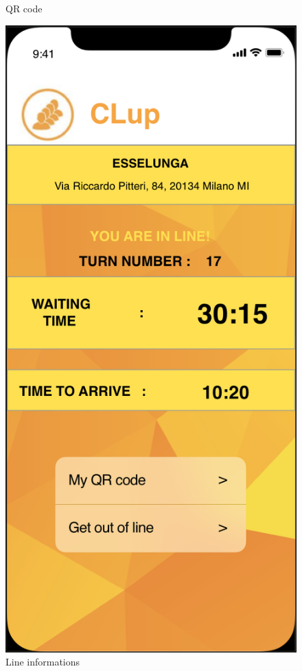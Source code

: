 \documentclass{article}
\begin{document}
\begin{figure}[H]
\begin{minipage}[b]{0.4\textwidth}
\caption{QR code}
\end{minipage}
\hfill
\begin{minipage}[b]{0.4\textwidth}
\centering
\includegraphics[width=\textwidth]{Waiting.png}
\caption{Line informations}
\end{minipage}
\end{figure}
\end{document}
